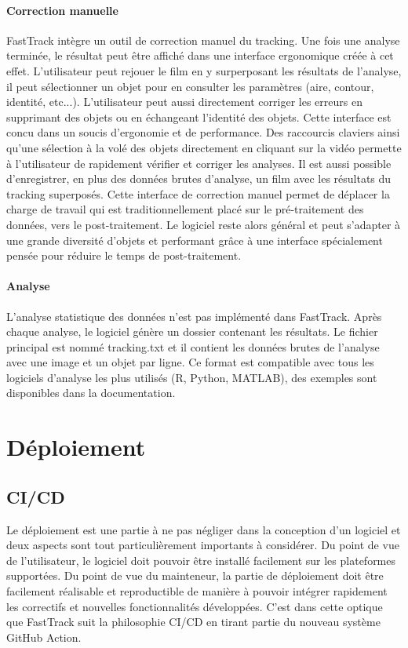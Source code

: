 		\paragraph{Correction manuelle}
		FastTrack intègre un outil de correction manuel du tracking. Une fois une analyse terminée, le résultat peut être affiché dans une interface ergonomique créée à cet effet. L'utilisateur peut rejouer le film en y surperposant les résultats de l'analyse, il peut sélectionner un objet pour en consulter les paramètres (aire, contour, identité, etc...). L'utilisateur peut aussi directement corriger les erreurs en supprimant des objets ou en échangeant l'identité des objets. Cette interface est concu dans un soucis d'ergonomie et de performance. Des raccourcis claviers ainsi qu'une sélection à la volé des objets directement en cliquant sur la vidéo permette à l'utilisateur de rapidement vérifier et corriger les analyses. Il est aussi possible d'enregistrer, en plus des données brutes d'analyse, un film avec les résultats du tracking superposés.
		Cette interface de correction manuel permet de déplacer la charge de travail qui est traditionnellement placé sur le pré-traitement des données, vers le post-traitement. Le logiciel reste alors général et peut s'adapter à une grande diversité d'objets et performant grâce à une interface spécialement pensée pour réduire le temps de post-traitement.
		
		\paragraph{Analyse}
		L'analyse statistique des données n'est pas implémenté dans FastTrack. Après chaque analyse, le logiciel génère un dossier contenant les résultats. Le fichier principal est nommé tracking.txt et il contient les données brutes de l'analyse avec une image et un objet par ligne. Ce format est compatible avec tous les logiciels d'analyse les plus utilisés (R, Python, MATLAB), des exemples sont disponibles dans la documentation.
		
	\section{Déploiement}
		\subsection{CI/CD}
		Le déploiement est une partie à ne pas négliger dans la conception d'un logiciel et deux aspects sont tout particulièrement importants à considérer. Du point de vue de l'utilisateur, le logiciel doit pouvoir être installé facilement sur les plateformes supportées. Du point de vue du mainteneur, la partie de déploiement doit être facilement réalisable et reproductible de manière à pouvoir intégrer rapidement les correctifs et nouvelles fonctionnalités développées. C'est dans cette optique que FastTrack suit la philosophie CI/CD en tirant partie du nouveau système GitHub Action.\\
		
